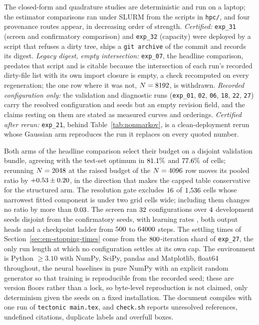 The closed-form and quadrature studies are deterministic and run on a laptop;
the estimator comparisons ran under SLURM from the scripts in \texttt{hpc/},
and four provenance routes appear, in decreasing order of strength.
\emph{Certified:} \texttt{exp\_31} (screen and confirmatory comparison) and
\texttt{exp\_32} (capacity) were deployed by a script that refuses a dirty
tree, ships a \texttt{git archive} of the commit and records its digest.
\emph{Legacy digest, empty intersection:} \texttt{exp\_07}, the headline
comparison, predates that script and is citable because the intersection of
each run's recorded dirty-file list with its own import closure is empty, a
check recomputed on every regeneration; the one row where it was not,
$N = 8192$, is withdrawn. \emph{Recorded configuration only:} the
validation and diagnostic runs (\texttt{exp\_01}, \texttt{02}, \texttt{06},
\texttt{18}, \texttt{22}, \texttt{27}) carry the resolved configuration and
seeds but an empty revision field, and the claims resting on them are stated
as measured curves and orderings. \emph{Certified after rerun:}
\texttt{exp\_21}, behind Table~\ref{tab:nonmarkov}, is a clean-deployment
rerun whose Gaussian arm reproduces the run it replaces on every quoted
number.

Both arms of the headline comparison select their budget on a disjoint
validation bundle, agreeing with the test-set optimum in $81.1\%$ and
$77.6\%$ of cells; rerunning $N = 2048$ at the raised budget of
the $N = 4096$ row moves its pooled ratio by
$+0.53 \pm 0.20$, in the direction that makes the capped
table conservative for the structured arm. The resolution gate excludes
$16$ of $1{,}536$ cells whose narrowest fitted component is under
two grid cells wide; including them changes no ratio by more than
$0.03$. The screen ran $32$ configurations over
$4$ development seeds disjoint from the confirmatory seeds, with
learning rates \screenlrs{}, both output heads and a checkpoint ladder from
$500$ to $64000$ steps. The settling times of
Section~\ref{sec:em-stopping-times} come from the $800$-iteration shard
of \texttt{exp\_27}, the only run length at which no configuration settles at
its own cap. The environment is Python $\ge 3.10$ with NumPy, SciPy, pandas
and Matplotlib, float64 throughout, the neural baselines in pure NumPy with
an explicit random generator so that training is reproducible from the
recorded seed; these are version floors rather than a lock, so byte-level
reproduction is not claimed, only determinism given the seeds on a fixed
installation. The document compiles with one run of
\texttt{tectonic main.tex}, and \texttt{check.sh} reports unresolved
references, undefined citations, duplicate labels and overfull boxes.

